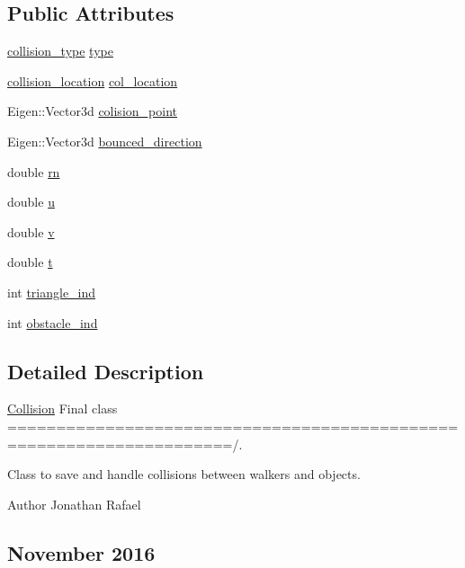 \subsection*{Public Attributes}
\begin{DoxyCompactItemize}
\item 
\hyperlink{class_collision_aa7f309840b693689b164c7e4b4d643e5}{collision\+\_\+type} \hyperlink{class_collision_a384809577e353e0905047beac856015b}{type}
\item 
\hyperlink{class_collision_aad433eb4e51dbfd7ab9bbe188fbe47ab}{collision\+\_\+location} \hyperlink{class_collision_ae35c71ff91ffc9c253a345f0b4e2fbba}{col\+\_\+location}
\item 
Eigen\+::\+Vector3d \hyperlink{class_collision_a00d821761200316e1d54eace02c725b4}{colision\+\_\+point}
\item 
Eigen\+::\+Vector3d \hyperlink{class_collision_aee20b80597eeea9b0c5a3ff0a5d0c81c}{bounced\+\_\+direction}
\item 
double \hyperlink{class_collision_a95898b1296dfa87b78e8a1197f0f5ea2}{rn}
\item 
double \hyperlink{class_collision_a6d79ffbca0e7f67fdc9af809f13f7f8a}{u}
\item 
double \hyperlink{class_collision_ade5759fea1e6b41812d2499f1dc06c02}{v}
\item 
double \hyperlink{class_collision_a195d201b0843d9f7190ac3a27761b4e7}{t}
\item 
int \hyperlink{class_collision_a50dfece7495474875117cfbb3c4f524d}{triangle\+\_\+ind}
\item 
int \hyperlink{class_collision_ad1f81d05e175689b7e31bf36121d1589}{obstacle\+\_\+ind}
\end{DoxyCompactItemize}


\subsection{Detailed Description}
\hyperlink{class_collision}{Collision} Final class =====================================================================/. 

Class to save and handle collisions between walkers and objects. \begin{DoxyAuthor}{Author}
Jonathan Rafael \subsection*{November 2016 }
\end{DoxyAuthor}


